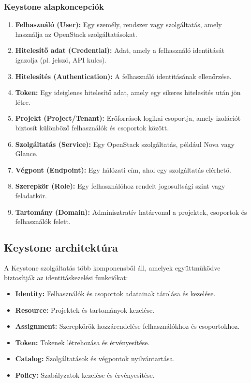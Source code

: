 \documentclass[a4paper,12pt]{article}
\begin{document}
    \subsubsection{Keystone alapkoncepciók}

    \begin{enumerate}
        \item \textbf{Felhasználó (User):} Egy személy, rendszer vagy szolgáltatás, amely használja az OpenStack szolgáltatásokat.

        \item \textbf{Hitelesítő adat (Credential):} Adat, amely a felhasználó identitását igazolja (pl. jelszó, API kulcs).

        \item \textbf{Hitelesítés (Authentication):} A felhasználó identitásának ellenőrzése.

        \item \textbf{Token:} Egy ideiglenes hitelesítő adat, amely egy sikeres hitelesítés után jön létre.

        \item \textbf{Projekt (Project/Tenant):} Erőforrások logikai csoportja, amely izolációt biztosít különböző felhasználók és csoportok között.

        \item \textbf{Szolgáltatás (Service):} Egy OpenStack szolgáltatás, például Nova vagy Glance.

        \item \textbf{Végpont (Endpoint):} Egy hálózati cím, ahol egy szolgáltatás elérhető.

        \item \textbf{Szerepkör (Role):} Egy felhasználóhoz rendelt jogosultsági szint vagy feladatkör.

        \item \textbf{Tartomány (Domain):} Adminisztratív határvonal a projektek, csoportok és felhasználók felett.
    \end{enumerate}

    \subsection{Keystone architektúra}

    A Keystone szolgáltatás több komponensből áll, amelyek együttműködve biztosítják az identitáskezelési funkciókat:

    \begin{itemize}
        \item \textbf{Identity:} Felhasználók és csoportok adatainak tárolása és kezelése.
        \item \textbf{Resource:} Projektek és tartományok kezelése.
        \item \textbf{Assignment:} Szerepkörök hozzárendelése felhasználókhoz és csoportokhoz.
        \item \textbf{Token:} Tokenek létrehozása és érvényesítése.
        \item \textbf{Catalog:} Szolgáltatások és végpontok nyilvántartása.
        \item \textbf{Policy:} Szabályzatok kezelése és érvényesítése.
    \end{itemize}
\end{document}
